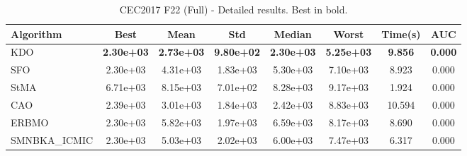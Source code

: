 \begin{table}[H]
\centering\small
\caption{CEC2017 F22 (Full) - Detailed results. Best in bold.}
\label{tab:cec2017_F22}
\begin{tabular}{lccccccc}
\toprule
\textbf{Algorithm} & \textbf{Best} & \textbf{Mean} & \textbf{Std} & \textbf{Median} & \textbf{Worst} & \textbf{Time(s)} & \textbf{AUC} \\
\midrule
KDO & \textbf{2.30e+03} & \textbf{2.73e+03} & \textbf{9.80e+02} & \textbf{2.30e+03} & \textbf{5.25e+03} & \textbf{9.856} & \textbf{0.000} \\
SFO & 2.30e+03 & 4.31e+03 & 1.83e+03 & 5.30e+03 & 7.10e+03 & 8.923 & 0.000 \\
StMA & 6.71e+03 & 8.15e+03 & 7.01e+02 & 8.28e+03 & 9.17e+03 & 1.924 & 0.000 \\
CAO & 2.39e+03 & 3.01e+03 & 1.84e+03 & 2.42e+03 & 8.83e+03 & 10.594 & 0.000 \\
ERBMO & 2.30e+03 & 5.82e+03 & 1.97e+03 & 6.59e+03 & 8.17e+03 & 8.690 & 0.000 \\
SMNBKA_ICMIC & 2.30e+03 & 5.03e+03 & 2.02e+03 & 6.00e+03 & 7.47e+03 & 6.317 & 0.000 \\
\bottomrule
\end{tabular}
\end{table}
